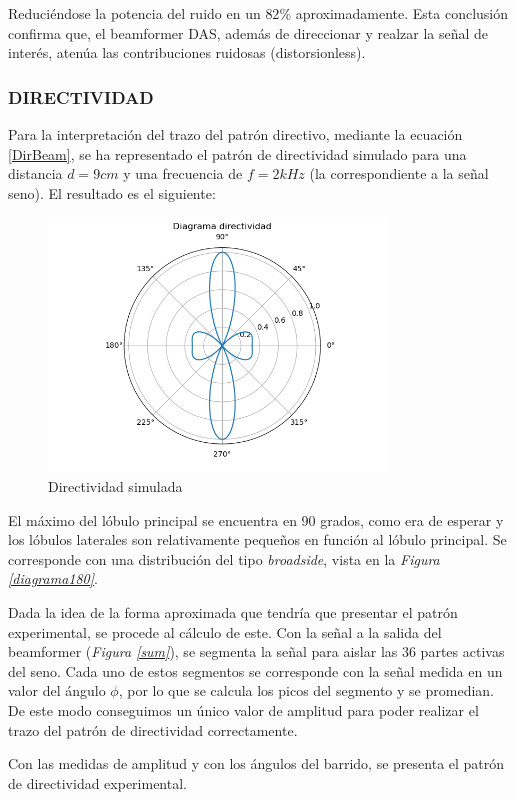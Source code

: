 \documentclass[a4paper,11pt]{book}
\begin{document}
Reduciéndose la potencia del ruido en un $82\%$ aproximadamente. Esta conclusión confirma que, el beamformer DAS, además de direccionar y realzar la señal de interés, atenúa las contribuciones ruidosas (distorsionless).

\subsubsection{DIRECTIVIDAD}
Para la interpretación del trazo del patrón directivo, mediante la ecuación \ref{DirBeam}, se ha representado el patrón de directividad simulado para una distancia $d = 9 cm$ y una frecuencia de $f = 2kHz$ (la correspondiente a la señal seno). El resultado es el siguiente:

\begin{figure}[hbtp]
\centering
\includegraphics[width = 9cm]{FIGURAS/directividad_SIM.png}
\caption{Directividad simulada}
\label{patronSIM}
\end{figure}

El máximo del lóbulo principal se encuentra en 90 grados, como era de esperar y los lóbulos laterales son relativamente pequeños en función al lóbulo principal. Se corresponde con una distribución del tipo \textit{broadside}, vista en la \textit{Figura \ref{diagrama180}}.

Dada la idea de la forma aproximada que tendría que presentar el patrón experimental, se procede al cálculo de este. Con la señal a la salida del beamformer (\textit{Figura \ref{sum}}), se segmenta la señal para aislar las 36 partes activas del seno. Cada uno de estos segmentos se corresponde con la señal medida en un valor del ángulo $\phi$, por lo que se calcula los picos del segmento y se promedian. De este modo conseguimos un único valor de amplitud para poder realizar el trazo del patrón de directividad correctamente.

Con las medidas de amplitud y con los ángulos del barrido, se presenta el patrón de directividad experimental.
\end{document}
